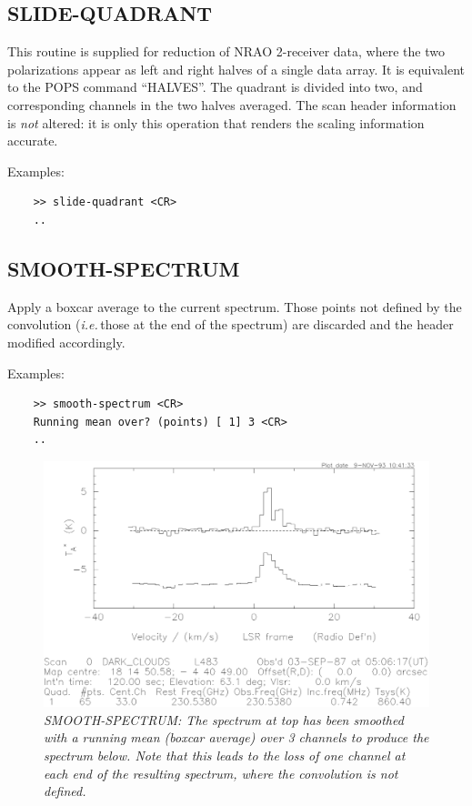 \documentclass[11pt,twoside]{report}
\newcommand{\ie}{{\it i.e.\,}}
\begin{document}
\subsection{SLIDE-QUADRANT} 

This routine is supplied for reduction of NRAO 2-receiver data, where
the two polarizations appear as left and right halves of a single data
array. It is equivalent to the POPS command ``HALVES''. The quadrant is
divided into two, and corresponding channels in the two halves averaged.
The scan header information is {\em not} altered: it is only this
operation that renders the scaling information accurate.

Examples:
\begin{verbatim}
    >> slide-quadrant <CR>
    ..
\end{verbatim}

\subsection{SMOOTH-SPECTRUM} 

Apply a boxcar average to the current spectrum. Those points not defined
by the convolution (\ie those at the end of the spectrum) are discarded and
the header modified accordingly.

Examples:
\begin{verbatim}
    >> smooth-spectrum <CR>
    Running mean over? (points) [ 1] 3 <CR>
    ..
\end{verbatim}

\begin{figure}[htbp]
\begin{center}
\includegraphics[scale=0.65]{smooth.ps}
\protect\parbox{5.5in}
{\caption[SMOOTH]
{\sl
SMOOTH-SPECTRUM: The spectrum at top has been smoothed with a running
mean (boxcar average) over 3 channels to produce the spectrum below.
Note that this leads to the loss of one channel at each end of the
resulting spectrum, where the convolution is not defined.
\label{SMOOTH}
}
}
\end{center}
\end{figure}
\end{document}
